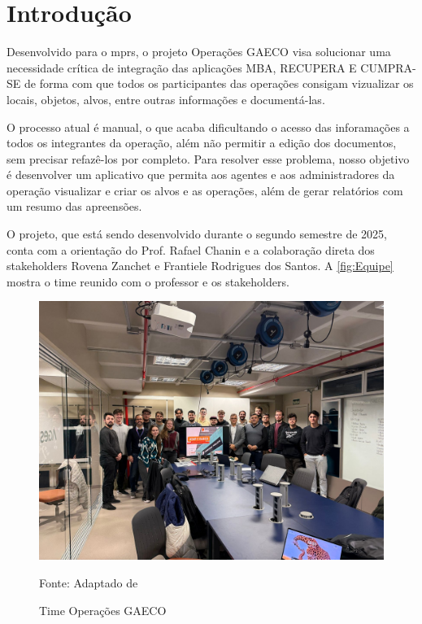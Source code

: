 \section[Introdução]{Introdução}
Desenvolvido para o \ac{mprs}, o projeto Operações GAECO visa solucionar uma necessidade crítica de integração das aplicações MBA, RECUPERA E CUMPRA-SE de forma com que todos os participantes das operações consigam vizualizar os locais, objetos, alvos, entre outras informações e documentá-las.

O processo atual é manual, o que acaba dificultando o acesso das inforamações a todos os integrantes da operação, além não permitir a edição dos documentos, sem precisar refazê-los por completo. Para resolver esse problema, nosso objetivo é desenvolver um aplicativo que permita aos agentes e aos administradores da operação visualizar e criar os alvos e as operações, além de gerar relatórios com um resumo das apreensões.

O projeto, que está sendo desenvolvido durante o segundo semestre de 2025, conta com a orientação do Prof. Rafael Chanin e a colaboração direta dos stakeholders Rovena Zanchet e Frantiele Rodrigues dos Santos. A \autoref{fig:Equipe} mostra o time reunido com o professor e os stakeholders.

\begin{figure}[H]
    \centering
    \small
    \includegraphics[width=1\linewidth]{conteudo//2 - ages I//conteudo//figures//Equipe.jpeg}
    \caption{Time Operações GAECO}
    Fonte: Adaptado de \textcites{wiki-Operacoes GAECO}
    \label{fig:Equipe}
\end{figure}